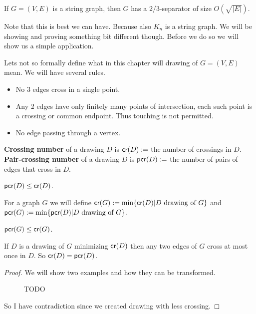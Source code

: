 \begin{thm}[Lee, 2017]
	If $G = (V,E)$ is a string graph, then $G$ has a $2/3$-separator of size $O(\sqrt{|E|})$.
	\label{lee}
\end{thm}

\noindent Note that this is best we can have. Because also $K_n$ is a string graph. We will be showing and proving something bit different though. Before we do so we will show us a simple application.

Lets not so formally define what in this chapter will drawing of $G = (V,E)$ mean. We will have several rules.

\begin{itemize}
	\item No 3 edges cross in a single point.
	\item Any 2 edges have only finitely many points of intersection, each such point is a crossing or common endpoint. Thus touching is not permitted.
	\item No edge passing through a vertex.
\end{itemize}

\begin{defn}
	\textbf{Crossing number} of a drawing $D$ is $\textsf{cr}(D) :=$ the number of crossings in $D$. \textbf{Pair-crossing number} of a drawing $D$ is $\textsf{pcr}(D) :=$ the number of pairs of edges that cross in $D$.
\end{defn}

\begin{observ}
	$\textsf{pcr}(D) \leq \textsf{cr}(D)$.
\end{observ}

For a graph $G$ we will define $\textsf{cr}(G) := \min \{\textsf{cr}(D) | D \text{ drawing of } G\}$ and $\textsf{pcr} (G):= \min \{\textsf{pcr}(D) | D \text{ drawing of } G\}$.

\begin{observ}
	$\textsf{pcr}(G) \leq \textsf{cr}(G)$.
\end{observ}

\begin{lemma}
	If $D$ is a drawing of $G$ minimizing $\textsf{cr}(D)$ then any two edges of $G$ cross at most once in $D$. So $\textsf{cr}(D) = \textsf{pcr}(D)$.
\end{lemma}

\begin{proof}
	We will show two examples and how they can be transformed.
	
	\begin{figure}
		\caption{TODO}
	\end{figure}
	
	So I have contradiction since we created drawing with less crossing.
\end{proof}

